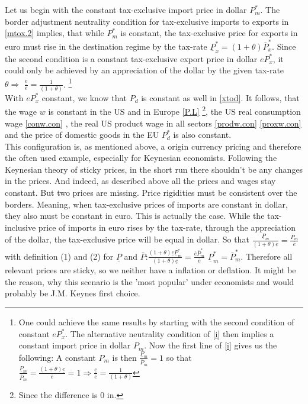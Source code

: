 Let us begin with the constant tax-exclusive import price in dollar $P_m^*$. The border adjustment neutrality condition for tax-exclusive imports to exports in \eqref{mtox.2} implies, that while $P_m^*$ is constant, the tax-exclusive price for exports in euro must rise in the destination regime by the tax-rate $ \underline P^*_x = (1+\theta) \overline P^*_x$. Since the second condition is a constant tax-exclusive export price in dollar $e  P^*_x$, it could only be achieved by an appreciation of the dollar by the given tax-rate $\theta \Rightarrow$ $\frac{\underline e}{\overline e} = \frac{1}{(1+\theta)}$. \footnote{One could achieve the same results by starting with the second condition of constant $e  P^*_x$. The alternative neutrality condition of \eqref{i} then implies a constant import price in dollar $P_m$. Now the first line of \eqref{i} gives us the following: A constant $P_m$ is then $\frac{\underline P_m}{\overline P_m} = 1$ so that  $\frac{\underline P_m}{\overline P_m} = \frac{(1+\theta)\underline e}{\overline e} = 1 \Rightarrow \frac{\underline e}{\overline e} = \frac{1}{(1+\theta)}$}
\\
With $eP^*_x$ constant, we know that $P_d$ is constant as well in \eqref{xtod}. It follows, that the wage $w$ is constant in the US and in Europe \eqref{P.L} \footnote{Since the difference is 0 in.}, the US real consumption wage \eqref{conw.con} , the real US product wage in all sectors \eqref{prodw.con} \eqref{proxw.con} and the price of domestic goods in the EU $P_d^*$ is also constant. \\
This configuration is, as mentioned above, a origin currency pricing and therefore the often used example, especially for Keynesian economists. Following the Keynesian theory of sticky prices, in the short run there shouldn't be any changes in the prices. And indeed, as described above all the prices and wages stay constant. But two prices are missing. Price rigidities must be consistent over the borders. Meaning, when tax-exclusive prices of imports are constant in dollar, they also must be constant in euro. This is actually the case. While the tax-inclusive price of imports in euro rises by the tax-rate, through the appreciation of the dollar, the tax-exclusive price will be equal in dollar. So that $\frac{\underline P_m}{(1+\theta)\underline e} = \frac{\overline P_m}{\overline e}$ with definition (1) and (2) for $\underline P$ and $\overline P$:\newline $\frac{(1+\theta)\underline e \underline P_m^*}{(1+\theta)\underline e} = \frac{\overline e \overline P_m^*}{\overline e}$ \Rightarrow \quad $\underline P_m^* = \overline P_m^*$. Therefore all relevant prices are sticky, so we neither have a inflation or deflation. It might be the reason, why this scenario is the 'most popular' under economists and would probably be J.M. Keynes first choice. 


